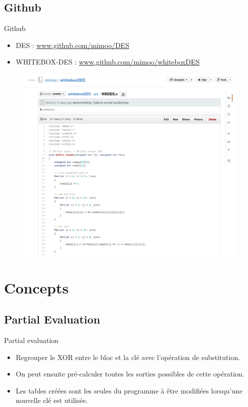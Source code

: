 \documentclass{beamer}
\begin{document}
\subsection{Github}
\begin{frame}{Github}
  \begin{itemize}
  \item DES : \url{www.github.com/mimoo/DES}
  \item WHITEBOX-DES : \url{www.github.com/mimoo/whiteboxDES}
  \end{itemize}

  \begin{figure}[h]
    \centering
    \includegraphics[scale=0.30]{./images/github.png}
  \end{figure}
\end{frame}

\section{Concepts}

\subsection{Partial Evaluation}
\begin{frame}{Partial evaluation}
\begin{itemize}
\item Regrouper le XOR entre le bloc et la clé avec l'opération de substitution.
\item On peut ensuite pré-calculer toutes les sorties possibles de cette opération.
\item Les tables créées sont les seules du programme à être modifiées lorsqu'une nouvelle clé est utilisée.
\end{itemize}
\end{frame}
\end{document}
